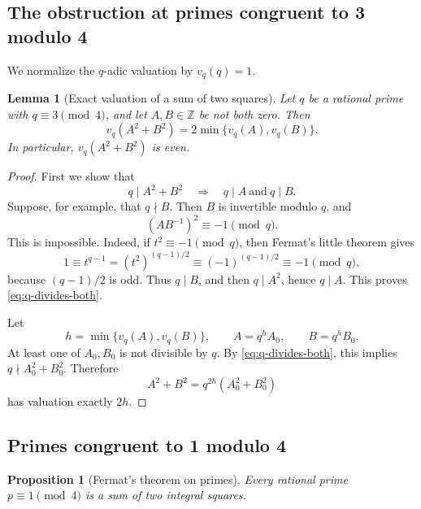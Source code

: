 \documentclass[11pt,a4paper]{article}
\numberwithin{equation}{section}
\newtheorem{proposition}[theorem]{Proposition}
\newtheorem{lemma}[theorem]{Lemma}
\theoremstyle{definition}
\newcommand{\Z}{\mathbb{Z}}
\begin{document}
\subsection{The obstruction at primes congruent to 3 modulo 4}

We normalize the $q$-adic valuation by $v_q(q)=1$.

\begin{lemma}[Exact valuation of a sum of two squares]
\label{lem:q3-valuation}
Let $q$ be a rational prime with $q\equiv3\pmod4$, and let $A,B\in\Z$ be not both zero. Then
\begin{equation}
 v_q(A^2+B^2)=2\min\{v_q(A),v_q(B)\}.
 \label{eq:exact-q-valuation}
\end{equation}
In particular, $v_q(A^2+B^2)$ is even.
\end{lemma}

\begin{proof}
First we show that
\begin{equation}
 q\mid A^2+B^2
 \quad\Longrightarrow\quad
 q\mid A\ \text{and}\ q\mid B.
 \label{eq:q-divides-both}
\end{equation}
Suppose, for example, that $q\nmid B$. Then $B$ is invertible modulo $q$, and
\[
 (AB^{-1})^2\equiv-1\pmod q.
\]
This is impossible. Indeed, if $t^2\equiv-1\pmod q$, then Fermat's little theorem gives
\[
 1\equiv t^{q-1}=(t^2)^{(q-1)/2}
 \equiv(-1)^{(q-1)/2}\equiv-1\pmod q,
\]
because $(q-1)/2$ is odd. Thus $q\mid B$, and then $q\mid A^2$, hence $q\mid A$. This proves \eqref{eq:q-divides-both}.

Let
\[
 h=\min\{v_q(A),v_q(B)\},
 \qquad
 A=q^hA_0,
 \qquad
 B=q^hB_0.
\]
At least one of $A_0,B_0$ is not divisible by $q$. By \eqref{eq:q-divides-both}, this implies
$q\nmid A_0^2+B_0^2$. Therefore
\[
 A^2+B^2=q^{2h}(A_0^2+B_0^2)
\]
has valuation exactly $2h$.
\end{proof}

\subsection{Primes congruent to 1 modulo 4}

\begin{proposition}[Fermat's theorem on primes]
\label{prop:fermat-prime}
Every rational prime $p\equiv1\pmod4$ is a sum of two integral squares.
\end{proposition}
\end{document}
